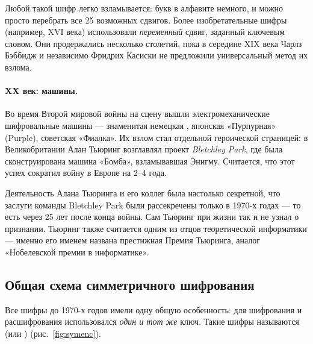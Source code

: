 Любой такой шифр легко взламывается: букв в алфавите немного, и можно просто перебрать все 25 возможных сдвигов. Более изобретательные шифры (например,  XVI века) использовали \emph{переменный} сдвиг, заданный ключевым словом. Они продержались несколько столетий, пока в середине XIX века Чарлз Бэббидж и независимо Фридрих Касиски не предложили универсальный метод их взлома.

\paragraph*{XX век: машины.} Во время Второй мировой войны на сцену вышли электромеханические шифровальные машины --- знаменитая немецкая , японская «Пурпурная» (Purple), советская «Фиалка». Их взлом стал отдельной героической страницей: в Великобритании Алан Тьюринг возглавлял проект \emph{Bletchley Park}, где была сконструирована машина «Бомба», взламывавшая Энигму. Считается, что этот успех сократил войну в Европе на 2--4 года.

\begin{interestbox}
Деятельность Алана Тьюринга и его коллег была настолько секретной, что заслуги команды Bletchley Park были рассекречены только в 1970-х годах --- то есть через 25 лет после конца войны. Сам Тьюринг при жизни так и не узнал о признании. Тьюринг также считается одним из отцов теоретической информатики --- именно его именем названа престижная Премия Тьюринга, аналог «Нобелевской премии в информатике».
\end{interestbox}

\subsection{Общая схема симметричного шифрования}

Все шифры до 1970-х годов имели одну общую особенность: для шифрования и расшифрования использовался \emph{один и тот же} ключ. Такие шифры называются  (или ) (рис.~\ref{fig:symenc}).

